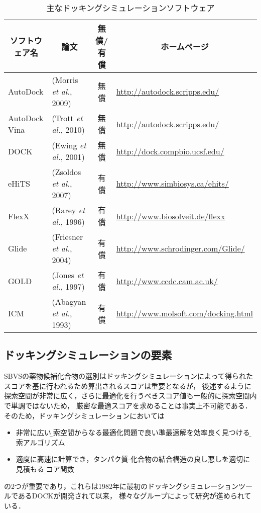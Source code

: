 \begin{table}[htb] \centering
	\caption{主なドッキングシミュレーションソフトウェア}
	\label{table:docking_tools_eg}
	\begin{tabular}{llcl}
	\hline
	\multicolumn{1}{c}{ソフトウェア名}	&\multicolumn{1}{c}{論文}						&\multicolumn{1}{c}{無償/有償}	&\multicolumn{1}{c}{ホームページ}	\\ \hline
	AutoDock					&(Morris {\it et al.}, 2009)\cite{Morris2009}		&無償									&\url{http://autodock.scripps.edu/}	\\ 
	AutoDock Vina				&(Trott  {\it et al.}, 2010)\cite{Trott2010}			&無償									&\url{http://autodock.scripps.edu/}	\\ 
	DOCK							&(Ewing {\it et al.}, 2001)\cite{Ewing2001}			&無償									&\url{http://dock.compbio.ucsf.edu/}	\\
	eHiTS							&(Zsoldos {\it et al.}, 2007)\cite{Zsoldos2007}											&有償									&\url{http://www.simbiosys.ca/ehits/}	\\
	FlexX							&(Rarey {\it et al.}, 1996)\cite{Rarey1996}																											&有償									&\url{http://www.biosolveit.de/flexx}	\\
	Glide							&(Friesner {\it et al.}, 2004)\cite{Friesner2004}									&有償									&\url{http://www.schrodinger.com/Glide/}	\\
	GOLD							&(Jones {\it et al.}, 1997)\cite{Jones1997}															&有償									&\url{http://www.ccdc.cam.ac.uk/}	\\
	ICM							&(Abagyan {\it et al.}, 1993)\cite{Abagyan1993}																				&有償									&\url{http://www.molsoft.com/docking.html}	\\ \hline
	\end{tabular}
\end{table}


\subsection{ドッキングシミュレーションの要素}\label{subsec:docking_elements}
SBVSの薬物候補化合物の選別はドッキングシミュレーションによって得られたスコアを基に行われるため算出されるスコアは重要となるが，
後述するように探索空間が非常に広く，さらに最適化を行うべきスコア値も一般的に探索空間内で単調ではないため，
厳密な最適スコアを求めることは事実上不可能である．そのため，ドッキングシミュレーションにおいては
\begin{itemize}
\item 非常に広い\b{探索空間}からなる最適化問題で良い準最適解を効率良く見つける\b{探索アルゴリズム}
\item 適度に高速に計算でき，タンパク質-化合物の結合構造の良し悪しを適切に見積もる\b{スコア関数}
\end{itemize}
の2つが重要であり，これらは1982年に最初のドッキングシミュレーションツールであるDOCK\cite{Kuntz1982}が開発されて以来，
様々なグループによって研究が進められている．

